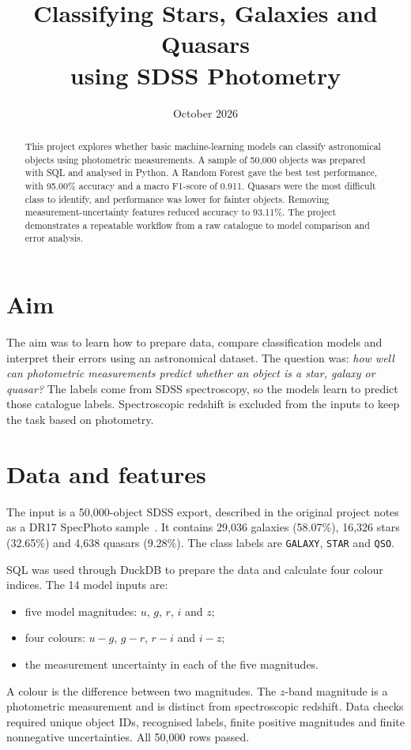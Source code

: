\documentclass[10pt,a4paper]{article}
\title{\vspace{-1.5cm}Classifying Stars, Galaxies and Quasars\\
using SDSS Photometry}
\author{}
\date{October 2026}
\begin{document}
\maketitle
\vspace{-1.2cm}

\begin{abstract}
This project explores whether basic machine-learning models can classify
astronomical objects using photometric measurements. A sample of 50,000 objects
was prepared with SQL and analysed in Python. A Random Forest gave the best
test performance, with 95.00\% accuracy and a macro F1-score of 0.911.
Quasars were the most difficult class to identify, and performance was lower
for fainter objects. Removing measurement-uncertainty features reduced accuracy
to 93.11\%. The project demonstrates a repeatable workflow from a raw catalogue
to model comparison and error analysis.
\end{abstract}

\section{Aim}
The aim was to learn how to prepare data, compare classification models and
interpret their errors using an astronomical dataset. The question was:
\emph{how well can photometric measurements predict whether an object is a
star, galaxy or quasar?}
The labels come from SDSS spectroscopy, so the models learn to predict those
catalogue labels. Spectroscopic redshift is excluded from the inputs to keep
the task based on photometry.

\section{Data and features}
The input is a 50,000-object SDSS export, described in the original project
notes as a DR17 SpecPhoto sample~\cite{sdss}. It contains 29,036 galaxies
(58.07\%), 16,326 stars (32.65\%) and 4,638 quasars (9.28\%). The class
labels are \texttt{GALAXY}, \texttt{STAR} and \texttt{QSO}.

SQL was used through DuckDB to prepare the data and calculate four colour
indices. The 14 model inputs are:
\begin{itemize}\setlength{\itemsep}{0pt}
  \item five model magnitudes: $u$, $g$, $r$, $i$ and $z$;
  \item four colours: $u-g$, $g-r$, $r-i$ and $i-z$;
  \item the measurement uncertainty in each of the five magnitudes.
\end{itemize}
A colour is the difference between two magnitudes. The $z$-band magnitude
is a photometric measurement and is distinct from spectroscopic redshift.
Data checks required unique object IDs, recognised labels, finite positive
magnitudes and finite nonnegative uncertainties. All 50,000 rows passed.
\end{document}
